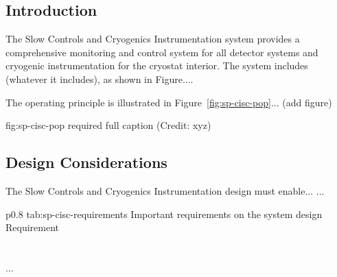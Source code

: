 \subsection{Introduction}
\label{sec:fddp-slow-cryo-intro}


The Slow Controls and Cryogenics Instrumentation system provides a
comprehensive monitoring and control system for all detector systems
and cryogenic instrumentation for the cryostat interior.
The system includes (whatever it includes), as shown in Figure.... 


The operating principle is illustrated in Figure~\ref{fig:sp-cisc-pop}... (add figure)

\begin{dunefigure}{fig:sp-cisc-pop}
{required full caption (Credit: xyz)}
\end{dunefigure}

\subsection{Design Considerations}
\label{sec:fddp-slow-cryo-des-consid}


The Slow Controls and Cryogenics Instrumentation design must enable... 
...


\begin{dunetable}
{p{0.8\textwidth}}
{tab:sp-cisc-requirements}
{Important requirements on the system design}   
Requirement  \\ \toprowrule
  \\ \colhline
   \\ \colhline
 ...\\ 
\end{dunetable}



